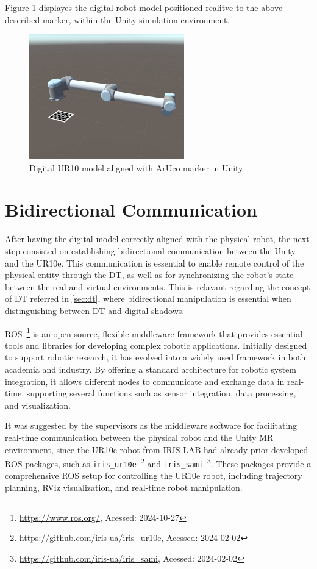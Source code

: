 Figure \ref{f:ur10_marker_unity} displayes the digital robot model positioned realitve to the above described marker, within the Unity simulation environment.

\begin{figure}[h]
    \centering
    \includegraphics[width=0.6\textwidth]{figs/robot_marker_unity.jpg}
    \caption{Digital UR10 model aligned with ArUco marker in Unity}
    \label{f:ur10_marker_unity}
\end{figure}

\section{Bidirectional Communication}

After having the digital model correctly aligned with the physical robot, the next step consisted on establishing bidirectional communication between the Unity and the UR10e. This communication is essential to enable remote control of the physical entity through the \ac{DT}, as well as for synchronizing the robot's state between the real and virtual environments. This is relavant regarding the concept of \ac{DT} referred in \ref{sec:dt}, where bidirectional manipulation is essential when distinguishing between \ac{DT} and digital shadows. 

\ac{ROS}~\footnote{\url{https://www.ros.org/}, Acessed: 2024-10-27} is an open-source, flexible middleware framework that provides essential tools and libraries for developing complex robotic applications. Initially designed to support robotic research, it has evolved into a widely used framework in both academia and industry. By offering a standard architecture for robotic system integration, it allows different nodes to communicate and exchange data in real-time, supporting several functions such as sensor integration, data processing, and visualization.

It was suggested by the supervisors as the middleware software for facilitating real-time communication between the physical robot and the Unity \ac{MR} environment, since the UR10e robot from IRIS-LAB had already prior developed \ac{ROS} packages, such as \texttt{iris\_ur10e}~\footnote{\url{https://github.com/iris-ua/iris_ur10e}, Acessed: 2024-02-02} and \texttt{iris\_sami}~\footnote{\url{https://github.com/iris-ua/iris_sami}, Acessed: 2024-02-02}. These packages provide a comprehensive \ac{ROS} setup for controlling the UR10e robot, including trajectory planning, RViz visualization, and real-time robot manipulation. 
